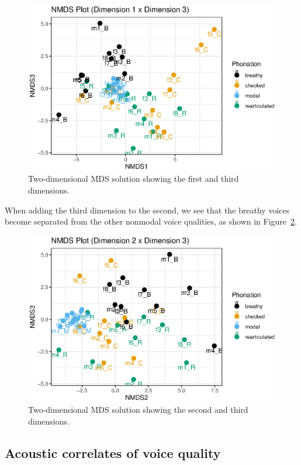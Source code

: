\begin{figure}[!h]
        \centering
        \includegraphics[width = \linewidth]{images/nmds13.eps}
        \caption{Two-dimensional MDS solution showing the first and third dimensions.}
        \label{fig:nmds13}
\end{figure}
    
When adding the third dimension to the second, we see that the breathy voices become separated from the other nonmodal voice qualities, as shown in Figure~\ref{fig:nmds23}. 

\begin{figure}[!h]
    \centering
    \includegraphics[width = \linewidth]{images/nmds23.eps}
    \caption{Two-dimensional MDS solution showing the second and third dimensions.}
    \label{fig:nmds23}
\end{figure}


\subsection{Acoustic correlates of voice quality} \label{sec:acousticlandscape:correlates}

